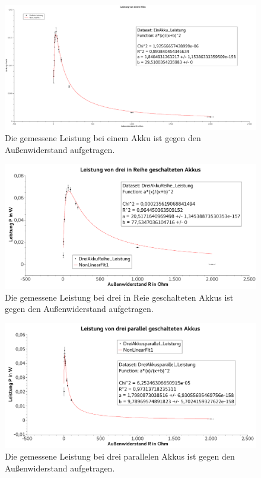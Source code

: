 \documentclass[
	a4paper,
	12pt,
	pagesize,
	ngerman
]{scrartcl}
\begin{document}
	\begin{figure}[tb]
		\includegraphics[width=1\textwidth]{Leistung1}
		\centering
		\caption{Die gemessene Leistung bei einem Akku ist gegen den Außenwiderstand aufgetragen.}
		\label{Leistung1}
		\centering
	\end{figure}
	\begin{figure}[tb]
		\includegraphics[width=1\textwidth]{Leistung3Reihe}
		\centering
		\caption{Die gemessene Leistung bei drei in Reie geschalteten Akkus ist gegen den Außenwiderstand aufgetragen.}
		\label{Leistung3Reihe}
		\centering
	\end{figure}
	\begin{figure}[tb]
		\includegraphics[width=1\textwidth]{Leistung3Parallel}
		\centering
		\caption{Die gemessene Leistung bei drei parallelen Akkus ist gegen den Außenwiderstand aufgetragen.}
		\label{Leistung3Parallel}
		\centering
	\end{figure}
	
\end{document}
